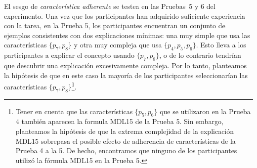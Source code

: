 \begin{hyp}\label{Hip:FeatureBiasStickiness}
El sesgo de \textit{característica adherente} se testea en las Pruebas~5 y 6 del experimento. Una vez que los participantes han adquirido suficiente experiencia con la tarea, en la Prueba 5, los participantes encuentran un conjunto de ejemplos consistentes con dos explicaciones mínimas: una muy simple que usa las características $\{p_7, p_8 \}$ y otra muy compleja que usa $\{p_4, p_5, p_6 \}$. Esto lleva a los participantes a explicar el concepto usando $\{p_7, p_8 \} $, o de lo contrario tendrían que descubrir una explicación excesivamente compleja. Por lo tanto, planteamos la hipótesis de que en este caso la mayoría de los participantes seleccionarían las características $\{p_7, p_8 \}$\footnote{Tener en cuenta que las características $\{p_5, p_6 \}$ que se utilizaron en la Prueba 4 también aparecen la formula MDL15 de la Prueba 5. Sin embargo, planteamos la hipótesis de que la extrema complejidad de la explicación MDL15 sobrepasa el posible efecto de adherencia de características de la Prueba 4 a la 5. De hecho, encontramos que ninguno de los participantes utilizó la fórmula MDL15 en la Prueba 5.}.
    

\end{hyp}
